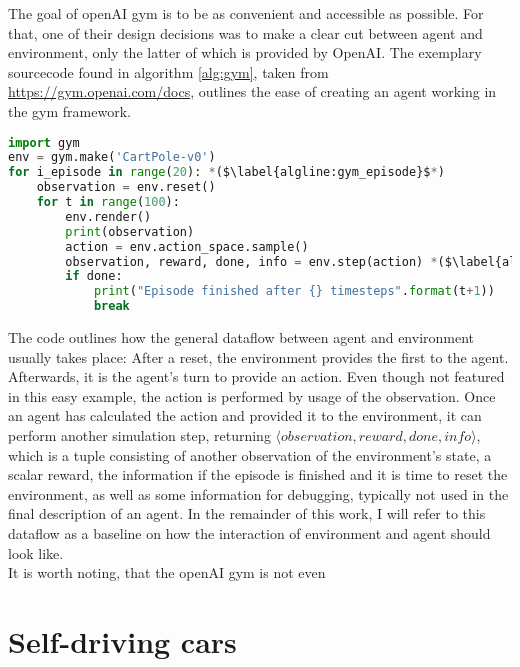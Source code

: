 The goal of openAI gym is to be as convenient and accessible as possible. For that, one of their design decisions was to make a clear cut between agent and environment, only the latter of which is provided by OpenAI. The exemplary sourcecode found in algorithm \ref{alg:gym}, taken from \url{https://gym.openai.com/docs}, outlines the ease of creating an agent working in the gym framework.
\begin{algorithm}[h]
\begin{lstlisting}[language=Python,frame=none]
import gym
env = gym.make('CartPole-v0')
for i_episode in range(20): *($\label{algline:gym_episode}$*)
	observation = env.reset()
	for t in range(100):
		env.render()
		print(observation)
		action = env.action_space.sample()
		observation, reward, done, info = env.step(action) *($\label{algline:gym_envstep}$*)
		if done:
			print("Episode finished after {} timesteps".format(t+1))
			break
\end{lstlisting}%
\caption{Interaction with the openAI gym environment}
\label{alg:gym}
\end{algorithm}


The code outlines how the general dataflow between agent and environment usually takes place: After a reset, the environment provides the first  to the agent. Afterwards, it is the agent's turn to provide an action. Even though not featured in this easy example, the action is performed by usage of the observation. Once an agent has calculated the action and provided it to the environment, it can perform another simulation step, returning $\langle observation, reward, done, info\rangle$, which is a tuple consisting of another observation of the environment's state, a scalar reward, the information if the episode is finished and it is time to reset the environment, as well as some information for debugging, typically not used in the final description of an agent. In the remainder of this work, I will refer to this dataflow as a baseline on how the interaction of environment and agent should look like.\\

It is worth noting, that the openAI gym is not even 


\section{Self-driving cars}

